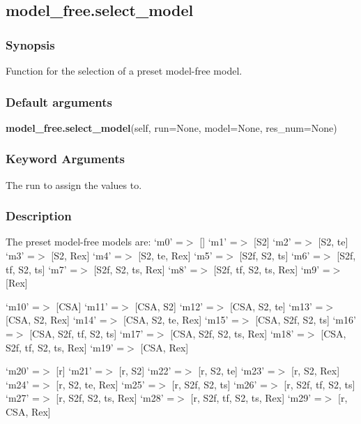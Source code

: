 \newpage

\subsection{model\_free.select\_model}


\subsubsection{Synopsis}

Function for the selection of a preset model-free model.

\subsubsection{Default arguments}

\textsf{\textbf{model\_free.select\_model}(self, run=None, model=None, res\_num=None)}


\subsubsection{Keyword Arguments}

  The run to assign the values to.


\subsubsection{Description}

The preset model-free models are:
    `m0'    =$>$ []
    `m1'    =$>$ [S2]
    `m2'    =$>$ [S2, te]
    `m3'    =$>$ [S2, Rex]
    `m4'    =$>$ [S2, te, Rex]
    `m5'    =$>$ [S2f, S2, ts]
    `m6'    =$>$ [S2f, tf, S2, ts]
    `m7'    =$>$ [S2f, S2, ts, Rex]
    `m8'    =$>$ [S2f, tf, S2, ts, Rex]
    `m9'    =$>$ [Rex]

    `m10'   =$>$ [CSA]
    `m11'   =$>$ [CSA, S2]
    `m12'   =$>$ [CSA, S2, te]
    `m13'   =$>$ [CSA, S2, Rex]
    `m14'   =$>$ [CSA, S2, te, Rex]
    `m15'   =$>$ [CSA, S2f, S2, ts]
    `m16'   =$>$ [CSA, S2f, tf, S2, ts]
    `m17'   =$>$ [CSA, S2f, S2, ts, Rex]
    `m18'   =$>$ [CSA, S2f, tf, S2, ts, Rex]
    `m19'   =$>$ [CSA, Rex]

    `m20'   =$>$ [r]
    `m21'   =$>$ [r, S2]
    `m22'   =$>$ [r, S2, te]
    `m23'   =$>$ [r, S2, Rex]
    `m24'   =$>$ [r, S2, te, Rex]
    `m25'   =$>$ [r, S2f, S2, ts]
    `m26'   =$>$ [r, S2f, tf, S2, ts]
    `m27'   =$>$ [r, S2f, S2, ts, Rex]
    `m28'   =$>$ [r, S2f, tf, S2, ts, Rex]
    `m29'   =$>$ [r, CSA, Rex]

